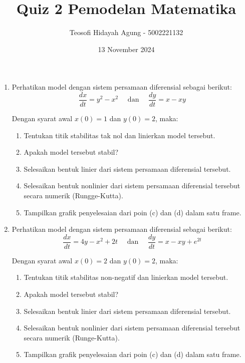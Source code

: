 \documentclass{article}
\title{\textbf{Quiz 2 Pemodelan Matematika}}
\author{Teosofi Hidayah Agung - 5002221132}
\date{13 November 2024}
\begin{document}
    \maketitle
    \setlength{\parindent}{0pt}
    \begin{enumerate}
        \item Perhatikan model dengan sistem persamaan diferensial sebagai berikut:
        \[\frac{dx}{dt} = y^2-x^2\quad\text{ dan }\quad\frac{dy}{dt} =x-xy\]
        
        Dengan syarat awal \( x(0) = 1 \) dan \( y(0) = 2 \), maka:
        
        \begin{enumerate}[label=\alph*.]
            \item Tentukan titik stabilitas tak nol dan linierkan model tersebut.
            \item Apakah model tersebut stabil?
            \item Selesaikan bentuk linier dari sistem persamaan diferensial tersebut.
            \item Selesaikan bentuk nonlinier dari sistem persamaan diferensial tersebut secara numerik (Rungge-Kutta).
            \item Tampilkan grafik penyelesaian dari poin (c) dan (d) dalam satu frame.
        \end{enumerate}

        \item Perhatikan model dengan sistem persamaan diferensial sebagai berikut:
        \[\frac{dx}{dt} = 4y-x^2+2t\quad\text{ dan }\quad\frac{dy}{dt} =x-xy+e^{2t}\]
        
        Dengan syarat awal \( x(0) = 2 \) dan \( y(0) = 2 \), maka:
        
        \begin{enumerate}[label=\alph*.]
            \item Tentukan titik stabilitas non-negatif dan linierkan model tersebut.
            \item Apakah model tersebut stabil?
            \item Selesaikan bentuk linier dari sistem persamaan diferensial tersebut.
            \item Selesaikan bentuk nonlinier dari sistem persamaan diferensial tersebut secara numerik (Runge-Kutta).
            \item Tampilkan grafik penyelesaian dari poin (c) dan (d) dalam satu frame.
        \end{enumerate}
    \end{enumerate}
\end{document}
